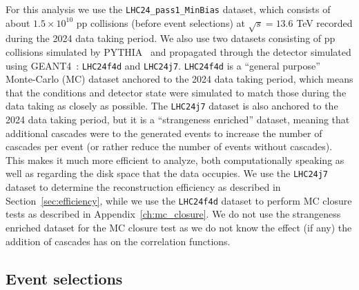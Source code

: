   For this analysis we use the \texttt{LHC24\_pass1\_MinBias} dataset, which consists of about $1.5 \times 10^{10}$ pp collisions (before event selections) at $\sqrt{s} = 13.6$ TeV recorded during the 2024 data taking period. We also use two datasets consisting of pp collisions simulated by PYTHIA~\cite{PythiaManual,PythiaCode} and propagated through the detector simulated using GEANT4~\cite{GEANT4}: \texttt{LHC24f4d} and \texttt{LHC24j7}. \texttt{LHC24f4d} is a ``general purpose'' Monte-Carlo (MC) dataset anchored to the 2024 data taking period, which means that the conditions and detector state were simulated to match those during the data taking as closely as possible. The \texttt{LHC24j7} dataset is also anchored to the 2024 data taking period, but it is a ``strangeness enriched'' dataset, meaning that additional cascades were to the generated events to increase the number of cascades per event (or rather reduce the number of events without cascades). This makes it much more efficient to analyze, both computationally speaking as well as regarding the disk space that the data occupies. We use the \texttt{LHC24j7} dataset to determine the reconstruction efficiency as described in Section~\ref{sec:efficiency}, while we use the \texttt{LHC24f4d} dataset to perform MC closure tests as described in Appendix~\ref{ch:mc_closure}. We do not use the strangeness enriched dataset for the MC closure test as we do not know the effect (if any) the addition of cascades has on the correlation functions.

  \subsection{Event selections}
  
